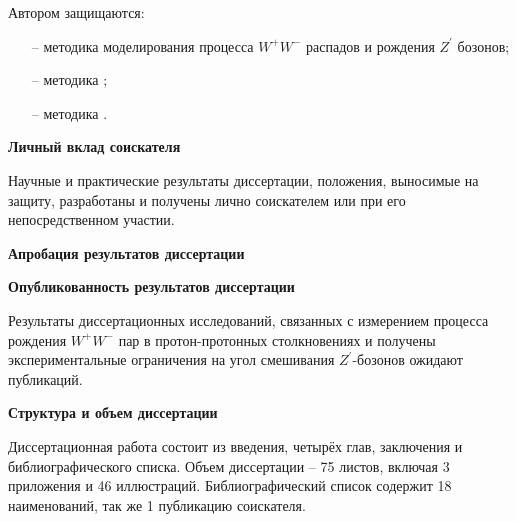 Автором защищаются:
\begin{itemize}
	\item[--] методика моделирования процесса ${W}^{+}{W}^{-}$ распадов и рождения ${Z}^{\prime}$ бозонов;
	
	\item[--] методика ;
	
	\item[--] методика . 
	
\end{itemize}

\textbf{Личный вклад соискателя}

Научные и практические результаты диссертации, положения, выносимые на защиту, разработаны и получены лично соискателем или при его непосредственном участии.

\textbf{Апробация результатов диссертации}



\textbf{Опубликованность результатов диссертации}

Результаты диссертационных исследований, связанных с измерением процесса рождения ${W}^{+}{W}^{-}$ пар в протон-протонных столкновениях и получены экспериментальные ограничения на угол смешивания ${Z}^{\prime}$-бозонов  ожидают публикаций.

\textbf{Структура и объем диссертации}

Диссертационная работа состоит из введения, четырёх глав, заключения и библиографического списка. Объем диссертации – 75 листов, включая 3 приложения и 46 иллюстраций. Библиографический список содержит 18 наименований, так же 1 публикацию соискателя.
